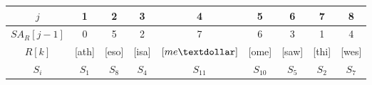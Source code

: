 \documentclass{subfiles}
\begin{document}
    \begin{table*}[!hb]
        \centering
        \begin{tabular}{|c|c c c c c c c c|}
            \hline 
            \(j\) & 1 & 2 & 3 & 4 & 5 & 6 & 7 & 8 \\ 
            \hline
            \(SA_{R}[j - 1]\) & 0 & 5 & 2 & 7 & 6 & 3 & 1 & 4 \\
            \(R[k]\) & [ath] & [eso] & [isa] & \([me\textdollar]\) & [ome] 
                & [saw] & [thi] & [wes] \\
            \(S_{i}\) & \(S_{1}\) & \(S_{8}\) & \(S_{4}\) & \(S_{11}\)
                & \(S_{10}\) & \(S_{5}\) & \(S_{2}\) & \(S_{7}\) \\
            \hline
        \end{tabular}
    \end{table*}
\end{document}
